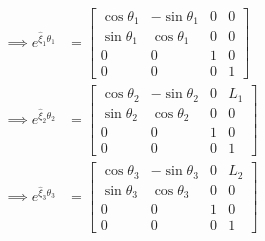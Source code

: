 \begin{align*}
    \implies
    e^{\widehat{\xi}_{1} \theta_{1}}
     & =
    \begin{bmatrix}
        \cos \theta_{1} & -\sin \theta_{1} & 0 & 0 \\
        \sin \theta_{1} & \cos \theta_{1}  & 0 & 0 \\
        0               & 0                & 1 & 0 \\
        0               & 0                & 0 & 1
    \end{bmatrix}
    \\
    \implies
    e^{\widehat{\xi}_{2} \theta_{2}}
     & =
    \begin{bmatrix}
        \cos \theta_{2} & -\sin \theta_{2} & 0 & L_1 \\
        \sin \theta_{2} & \cos \theta_{2}  & 0 & 0   \\
        0               & 0                & 1 & 0   \\
        0               & 0                & 0 & 1
    \end{bmatrix}
    \\
    \implies
    e^{\widehat{\xi}_{3} \theta_{3}}
     & =
    \begin{bmatrix}
        \cos \theta_{3} & -\sin \theta_{3} & 0 & L_2 \\
        \sin \theta_{3} & \cos \theta_{3}  & 0 & 0   \\
        0               & 0                & 1 & 0   \\
        0               & 0                & 0 & 1
    \end{bmatrix}
\end{align*}

